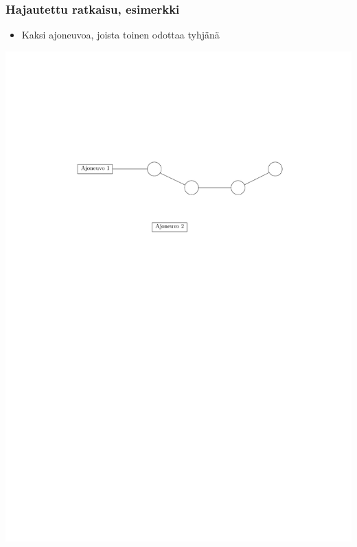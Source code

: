 \documentclass{beamer}
\begin{document}
                \begin{frame}
  \frametitle{Hajautettu ratkaisu, esimerkki}   %
\begin{minipage}[t][0.3\textheight][t]{\textwidth}
  \begin{itemize}
 \item 
 Kaksi ajoneuvoa, joista toinen odottaa tyhjänä
\end{itemize}
  \end{minipage}
  \vfill
  \begin{minipage}{\textwidth}
    \centering
\includegraphics[scale=0.6]{valinta01}
  \end{minipage}
    \end{frame}
    
\end{document}
